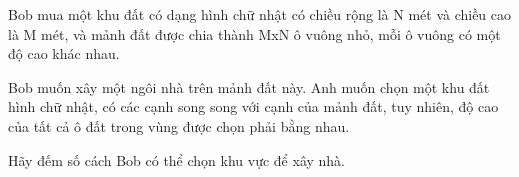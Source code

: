 Bob mua một khu đất có dạng hình chữ nhật có chiều rộng là N mét và chiều cao là M mét, và mảnh đất được chia thành MxN ô vuông nhỏ, mỗi ô vuông có một độ cao khác nhau.

Bob muốn xây một ngôi nhà trên mảnh đất này. Anh muốn chọn một khu đất hình chữ nhật, có các cạnh song song với cạnh của mảnh đất, tuy nhiên, độ cao của tất cả ô đất trong vùng được chọn phải bằng nhau.

Hãy đếm số cách Bob có thể chọn khu vực để xây nhà.

\